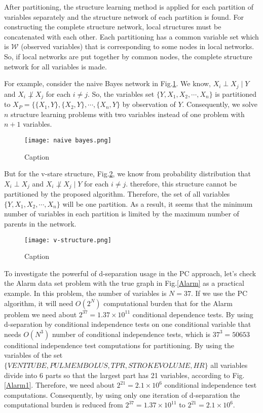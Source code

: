 \documentclass{article}
\newcommand{\W}{\mathcal{W}}
\begin{document}
After partitioning, the structure learning method is applied for each partition of variables separately and the structure network of each partition is found. For constructing the complete structure network, local structures must be concatenated with each other. Each partitioning has a common variable set which is $\W$ (observed variables) that is corresponding to some nodes in local networks. So, if local networks are put together by common nodes, the complete structure network for all variables is made.

For example, consider the naive Bayes network in Fig.\ref{f-naive}. We know, $X_i\perp X_j \mid Y$ and $X_i\not\perp X_j$ for each $i\not = j$. So, the variables set $\{Y,X_1,X_2,\cdots, X_n\}$ is partitioned to $X_P = \{ \{X_1,Y\}, \{X_2,Y\}, \cdots, \{X_n,Y\}$ by observation of $Y$. Consequently, we solve $n$ structure learning problems with two variables instead of one problem with $n+1$ variables.

\begin{figure}[!ht]
    \centering
    \texttt{[image: naive bayes.png]}
    \caption{Caption}
    \label{f-naive}
\end{figure}

But for the v-stare structure, Fig.\ref{f-vstare}, we know from probability distribution that $X_i\perp X_j$ and  $X_i\not\perp X_j\mid Y$ for each $i\not = j$. therefore, this structure cannot be partitioned by the proposed algorithm. Therefore, the set of all variables $\{Y,X_1,X_2,\cdots, X_n\}$ will be one partition. As a result, it seems that the minimum number of variables in each partition is limited by the maximum number of parents in the network.
\begin{figure}[!ht]
    \centering
    \texttt{[image: v-structure.png]}
    \caption{Caption}
    \label{f-vstare}
\end{figure}

To investigate the powerful of d-separation usage in the PC approach, let's check the Alarm data set problem with the true graph in Fig.\ref{Alarm} as a practical example.
In this problem, the number of variables is $N=37$. If we use the PC algorithm, it will need $O(2^N)$ computational burden that for the Alarm problem we need about $2^{37}=1.37\times 10^{11}$ conditional dependence tests.
By using d-separation by conditional independence tests on one conditional variable that needs $O(N^3)$ number of conditional independence tests, which is $37^3=50653$ conditional independence test computations for partitioning. By using the variables of the set $\{VENTTUBE, PULMEMBOLUS, TPR, STROKEVOLUME, HR \}$ all variables divide into 6 parts so that the largest part has 21 variables, according to Fig.\ref{Alarm1}. Therefore, we need about $2^{21}=2.1\times 10^6$ conditional independence test computations. Consequently, by using only one iteration of d-separation the computational burden is reduced from $2^{37}=1.37\times 10^{11}$ to $2^{21}=2.1\times 10^6$.
\end{document}
